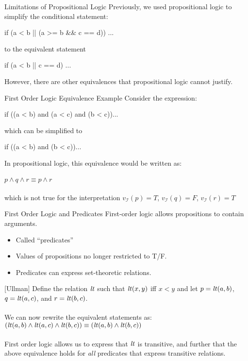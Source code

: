 \documentclass[style=sailor,size=12pt]{powerdot}
\begin{document}
\begin{wideslide}[bm=,toc=]{Limitations of Propositional Logic}
Previously, we used propositional logic to simplify the conditional statement:
\begin{program}
if (a < b || (a >= b \&\& c == d)) ...
\end{program}
to the equivalent statement
\vspace{-1em}
\begin{program}
if (a < b || c == d) ...
\end{program}
However, there are other equivalences that propositional logic cannot justify.
\end{wideslide}

\begin{wideslide}[bm=,toc=]{First Order Logic Equivalence Example}
Consider the expression:
\begin{program}
if ((a < b) and (a < c) and (b < c))...
\end{program}
which can be simplified to
\vspace{-1em}
\begin{program}
if ((a < b) and (b < c))...
\end{program}
\vspace{-1em}
In propositional logic, this equivalence would be written as:\\~\\
$p \land q \land r \equiv p \land r$\\~\\
which is not true for the interpretation $v_{\mathcal{I}}(p) = T$,
   $v_{\mathcal{I}}(q) = F$, $v_{\mathcal{I}}(r) = T$
\end{wideslide}

\begin{wideslide}[bm=,toc=]{First Order Logic and Predicates}
First-order logic allows propositions to contain arguments.
\begin{itemize}
\item Called ``predicates''
\item Values of propositions no longer restricted to T/F.
\item Predicates can express set-theoretic relations.
\end{itemize}
\begin{ex}{}[Ullman]
Define the relation $\mbox{\it lt\/}$ such that $\mbox{\it lt\/}(x,y)$ iff $x < y$ and let $p = \mbox{\it lt\/}(a,b)$, $q = \mbox{\it lt\/}(a,c)$, and $r = \mbox{\it lt\/}(b,c)$.
\\~\\
We can now rewrite the equivalent statements as:\\
$(\mbox{\it lt\/}(a,b) \land \mbox{\it lt\/}(a,c) \land \mbox{\it lt\/}(b,c)) \equiv (\mbox{\it lt\/}(a,b) \land \mbox{\it lt\/}(b,c))$
\\~\\
First order logic allows us to express that $\mbox{\it lt\/}$ is transitive, and further that the above
equivalence holds for \emph{all} predicates that express transitive relations.
\end{ex}
\end{wideslide}
\end{document}
